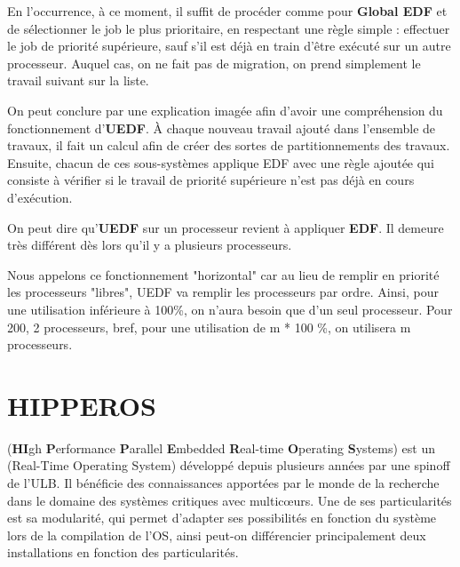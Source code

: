 		En l'occurrence, à ce moment, il suffit de procéder comme pour \textbf{Global EDF} et de sélectionner le job le plus prioritaire, en respectant 
		une règle simple : effectuer le job de priorité supérieure, sauf s'il 
		est déjà en train d'être exécuté sur un autre processeur. Auquel cas, on ne 
		fait pas de migration, on prend simplement le travail suivant sur la liste.\newline
		
		On peut conclure par une explication imagée afin d'avoir une compréhension du fonctionnement d'\textbf{UEDF}. À chaque nouveau travail ajouté dans l'ensemble de travaux, 
		il fait un calcul afin de créer des sortes de partitionnements des travaux. 
		Ensuite, chacun de ces sous-systèmes applique EDF avec une règle ajoutée qui consiste 
		à vérifier si le travail de priorité supérieure n'est pas déjà en cours d'exécution.
		
		On peut dire qu'\textbf{UEDF} sur un processeur revient à appliquer \textbf{EDF}. Il 
		demeure très différent dès lors qu'il y a plusieurs processeurs.
		
		
		
		Nous appelons ce fonctionnement "horizontal" car au lieu de remplir 
		en priorité les processeurs "libres", UEDF va remplir les 
		processeurs par ordre. Ainsi, pour une utilisation inférieure à 100\%, 
		on n'aura besoin que d'un seul processeur. Pour 200, 2 processeurs, bref, 
		pour une utilisation de m * 100 \%, on utilisera m processeurs.
		
		
\section{HIPPEROS}
	 (\textbf{HI}gh \textbf{P}erformance \textbf{P}arallel \textbf{E}mbedded \textbf{R}eal-time \textbf{O}perating \textbf{S}ystems)
	est un  (Real-Time Operating System) développé depuis plusieurs années par une spinoff de l'ULB.
	Il bénéficie des connaissances apportées par le monde de la recherche dans 
	le domaine des systèmes critiques avec multic\oe{}urs. Une de ses particularités 
	est sa modularité, qui permet d'adapter ses possibilités en fonction du système 
	lors de la compilation de l'OS, ainsi peut-on différencier principalement 
	deux installations en fonction des particularités. 
	
